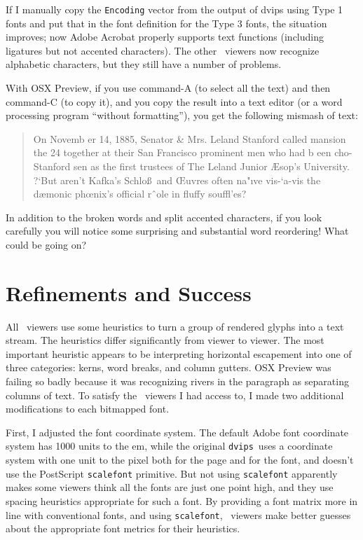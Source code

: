 \documentclass{ltugboat}
\def\PDF{\acro{PDF}}
\def\dvips{\texttt{dvips}}
\begin{document}
If I manually copy the \texttt{Encoding} vector from
the output of dvips using Type 1 fonts and put that
in the font definition for the Type 3 fonts, the situation
improves; now Adobe Acrobat properly supports text
functions (including ligatures but not accented
characters).  The other \PDF\ viewers now recognize
alphabetic characters, but they still have a number of
problems.

With OSX Preview, if you use command-A
(to select all the text) and then command-C (to copy
it), and you copy the result into a text editor (or
a word processing program ``without formatting''),
you get the following mismash of text:

\begin{quote}
\raggedright
On Novemb er 14, 1885, Senator \& Mrs. Leland
Stanford called
mansion the 24
together at their San Francisco
prominent men who had
b een cho-
Stanford
sen as the first trustees of The Leland
Junior
{\AE}sop’s
University. ?`But aren’t Kafka’s Schlo\ss\ and
{\OE}uvres often na"ıve vis-`a-vis the dæmonic
ph{\oe}nix’s official rˆole in fluffy souffl'es?
\end{quote}
\noindent
In addition to the broken words and split accented
characters, if you look carefully you will notice
some surprising
and substantial word reordering!  What could
be going on?

\section{Refinements and Success}

All \PDF\ viewers use some heuristics
to turn a group of rendered glyphs into a text stream.
The heuristics differ significantly from viewer to
viewer.  The most important heuristic appears to be
interpreting horizontal escapement into one of
three categories: kerns, word breaks, and column
gutters.  OSX Preview was failing so badly because it
was recognizing rivers in the paragraph as separating
columns of text.
To satisfy the \PDF\ viewers I had access to,
I made two additional modifications to each bitmapped font.

First, I adjusted the font coordinate system.
The default Adobe font coordinate system has 1000 units
to the em, while the original
\dvips\ uses a coordinate system with one unit to the
pixel both for the page and for the font, and doesn't use
the PostScript \texttt{scalefont} primitive.  But not using
\texttt{scalefont} apparently makes some viewers think all the
fonts are just one point high, and they use spacing heuristics
appropriate for such a font.  By providing a font matrix
more in line with conventional fonts, and using
\texttt{scalefont}, \PDF\ viewers make better guesses about
the appropriate font metrics for their heuristics.
\end{document}
